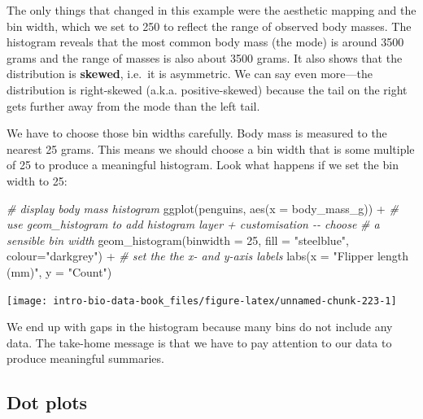 \documentclass[
]{book}
\newenvironment{Shaded}{\begin{snugshade}}{\end{snugshade}}
\newcommand{\AttributeTok}[1]{\textcolor[rgb]{0.77,0.63,0.00}{#1}}
\newcommand{\CommentTok}[1]{\textcolor[rgb]{0.56,0.35,0.01}{\textit{#1}}}
\newcommand{\DecValTok}[1]{\textcolor[rgb]{0.00,0.00,0.81}{#1}}
\newcommand{\FunctionTok}[1]{\textcolor[rgb]{0.00,0.00,0.00}{#1}}
\newcommand{\NormalTok}[1]{#1}
\newcommand{\SpecialCharTok}[1]{\textcolor[rgb]{0.00,0.00,0.00}{#1}}
\newcommand{\StringTok}[1]{\textcolor[rgb]{0.31,0.60,0.02}{#1}}
\begin{document}
The only things that changed in this example were the aesthetic mapping and the bin width, which we set to 250 to reflect the range of observed body masses. The histogram reveals that the most common body mass (the mode) is around 3500 grams and the range of masses is also about 3500 grams. It also shows that the distribution is \textbf{skewed}, i.e.~it is asymmetric. We can say even more---the distribution is right-skewed (a.k.a. positive-skewed) because the tail on the right gets further away from the mode than the left tail.

We have to choose those bin widths carefully. Body mass is measured to the nearest 25 grams. This means we should choose a bin width that is some multiple of 25 to produce a meaningful histogram. Look what happens if we set the bin width to 25:

\begin{Shaded}
\begin{Highlighting}[]
\CommentTok{\# display body mass histogram}
\FunctionTok{ggplot}\NormalTok{(penguins, }\FunctionTok{aes}\NormalTok{(}\AttributeTok{x =}\NormalTok{ body\_mass\_g)) }\SpecialCharTok{+} 
  \CommentTok{\# use geom\_histogram to add histogram layer + customisation {-}{-} choose }
  \CommentTok{\# a sensible bin width}
  \FunctionTok{geom\_histogram}\NormalTok{(}\AttributeTok{binwidth =} \DecValTok{25}\NormalTok{, }\AttributeTok{fill =} \StringTok{"steelblue"}\NormalTok{, }\AttributeTok{colour=}\StringTok{"darkgrey"}\NormalTok{) }\SpecialCharTok{+} 
  \CommentTok{\# set the the x{-} and y{-}axis labels}
  \FunctionTok{labs}\NormalTok{(}\AttributeTok{x =} \StringTok{"Flipper length (mm)"}\NormalTok{, }\AttributeTok{y =} \StringTok{"Count"}\NormalTok{)}
\end{Highlighting}
\end{Shaded}

\begin{center}\texttt{[image: intro-bio-data-book\_files/figure-latex/unnamed-chunk-223-1]} \end{center}

We end up with gaps in the histogram because many bins do not include any data. The take-home message is that we have to pay attention to our data to produce meaningful summaries.

\hypertarget{dot-plots}{%
\subsection{Dot plots}\label{dot-plots}}
\end{document}
